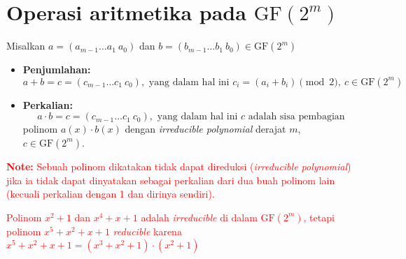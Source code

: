 \documentclass{article}
\begin{document}

\section*{Operasi aritmetika pada $\text{GF}(2^m)$}

Misalkan $a = (a_{m-1} \dots a_1 \ a_0)$ dan $b = (b_{m-1} \dots b_1 \ b_0) \in \text{GF}(2^m)$

\begin{itemize}
    \item \textbf{Penjumlahan:}
    \[ a + b = c = (c_{m-1} \dots c_1 \ c_0), \text{ yang dalam hal ini } c_i = (a_i + b_i) \pmod{2}, \ c \in \text{GF}(2^m) \]

    \item \textbf{Perkalian:}
    \[ a \cdot b = c = (c_{m-1} \dots c_1 \ c_0), \text{ yang dalam hal ini } c \text{ adalah sisa pembagian} \]
    polinom $a(x) \cdot b(x)$ dengan \textit{irreducible polynomial} derajat $m$, $c \in \text{GF}(2^m)$.
\end{itemize}

\textcolor{red}{\textbf{Note:} Sebuah polinom dikatakan tidak dapat direduksi (\textit{irreducible polynomial}) jika ia tidak dapat dinyatakan sebagai perkalian dari dua buah polinom lain (kecuali perkalian dengan 1 dan dirinya sendiri).

Polinom $x^2 + 1$ dan $x^4 + x + 1$ adalah \textit{irreducible} di dalam $\text{GF}(2^m)$, tetapi polinom $x^5 + x^2 + x + 1$ \textit{reducible} karena $x^5 + x^2 + x + 1 = (x^3 + x^2 + 1) \cdot (x^2 + 1)$}
\end{document}
